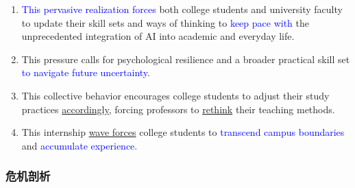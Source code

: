 \begin{enumerate}
\item \textcolor{blue}{This pervasive realization forces} both college students and university faculty to update their skill sets and ways of thinking to \textcolor{blue}{keep pace with} the unprecedented integration of AI into academic and everyday life.
\item This pressure calls for psychological resilience and a broader practical skill set \textcolor{blue}{to navigate future uncertainty}. 
\item This collective behavior encourages college students to adjust their study practices \underline{accordingly}, forcing professors to \underline{rethink} their teaching methods.
\item This internship \underline{wave forces} college students to \textcolor{blue}{transcend campus boundaries} and \textcolor{blue}{accumulate experience}.
\end{enumerate}


\subsubsection{危机剖析}

